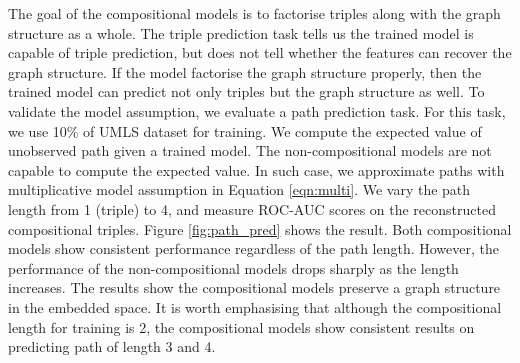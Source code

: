 The goal of the compositional models is to factorise triples along with the graph structure as a whole.
The triple prediction task tells us the trained model is capable of triple prediction,
but does not tell whether the features can recover the graph structure.
If the model factorise the graph structure properly,
then the trained model can predict not only triples but the graph structure as well.
To validate the model assumption, we evaluate a path prediction task.
For this task, we use 10\% of UMLS dataset for training.
We compute the expected value of unobserved path given a trained model.
The non-compositional models are not capable to compute the expected value.
In such case, we approximate paths with multiplicative model assumption in Equation \ref{eqn:multi}.
We vary the path length from 1 (triple) to 4, and measure ROC-AUC scores on the reconstructed compositional triples.
Figure \ref{fig:path_pred} shows the result.
Both compositional models show consistent performance regardless of the path length.
However, the performance of the non-compositional models drops sharply as the length increases.
The results show the compositional models preserve a graph structure in the embedded space.
It is worth emphasising that although the compositional length for training is 2,
the compositional models show consistent results on predicting path of length 3 and 4.

